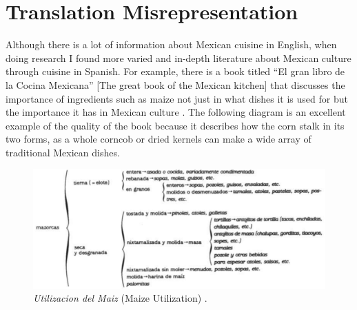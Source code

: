 \documentclass[11pt,twocolumn]{article}
\begin{document}
\section{Translation Misrepresentation}
Although there is a lot of information about Mexican cuisine in English, when doing research I found more varied and in-depth literature about Mexican culture through cuisine in Spanish. For example, there is a book titled “El gran libro de la Cocina Mexicana” [The great book of the Mexican kitchen] that discusses the importance of ingredients such as maize not just in what dishes it is used for but the importance it has in Mexican culture \cite{granlibro1988}. The following diagram is an excellent example of the quality of the book because it describes how the corn stalk in its two forms, as a whole corncob or dried kernels can make a wide array of traditional Mexican dishes. 
\begin{figure}[h]
    \centering
    \includegraphics[width=\linewidth]{utilizaciondemaiz.png}
    \caption{
        \emph{Utilizacion del Maiz} (Maize Utilization) \cite{granlibro1988}.
    }
    \label{structures}
\end{figure}
\end{document}
